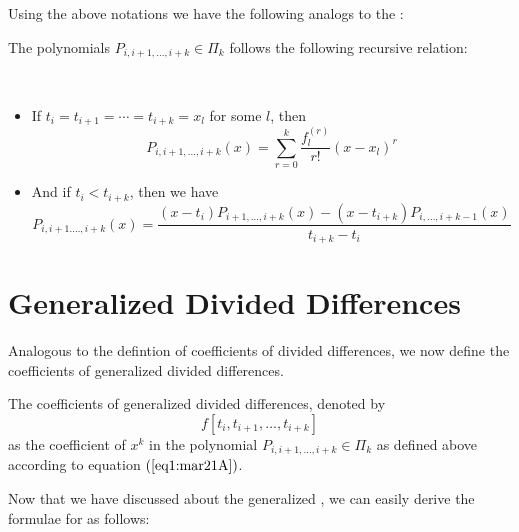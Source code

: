 Using the above notations we have the following analogs to the :

\begin{thm}\label{thm1:mar21A}
    The polynomials $P_{i,i+1,\dots,i+k} \in \Pi_k$ follows the following recursive relation:
    
    \ 

    \begin{itemize}
        \item If $t_i = t_{i+1} = \cdots = t_{i+k} = x_l$ for some $l$, then 
        \begin{equation}\label{eq2:mar21A}
            P_{i,i+1,\dots,i+k}(x) = \sum_{r=0}^k \frac{f^{(r)}_l}{r!} (x-x_l)^r 
        \end{equation}
        \item  And if $t_i < t_{i+k}$, then we have 
        \begin{equation}\label{eq3:mar21A}
            P_{i,i+1.\dots,i+k}(x) = \frac{(x-t_i)P_{i+1,\dots,i+k}(x) - (x - t_{i+k})P_{i,\dots,i+k-1}(x)}{t_{i+k} - t_i}
        \end{equation}
    \end{itemize} 
\end{thm}

\section{Generalized Divided Differences}

Analogous to the defintion of coefficients of divided differences, we now define the coefficients of generalized divided differences.

\begin{defn}
    The coefficients of generalized divided differences, denoted by 
    \[
        f[t_i, t_{i+1}, \dots, t_{i+k}]  
    \]
    as the coefficient of $x^k$ in the polynomial $P_{i,i+1, \dots, i+k} \in \Pi_k$ as defined above according to equation $(\ref{eq1:mar21A})$.
\end{defn}

Now that we have discussed about the generalized , we can easily derive the formulae for  as follows: 

